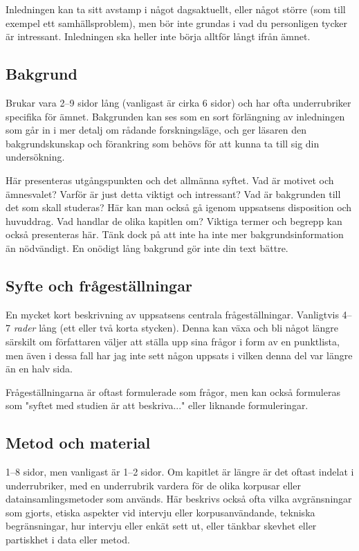 Inledningen kan ta sitt avstamp i något dagsaktuellt, eller något större (som
till exempel ett samhällsproblem), men bör inte grundas i vad du personligen
tycker är intressant. Inledningen ska heller inte börja alltför långt ifrån
ämnet.


\subsection{Bakgrund}
\label{rubrik.bakgrund}

Brukar vara 2--9 sidor lång (vanligast är cirka 6 sidor) och har ofta
underrubriker specifika för ämnet. Bakgrunden kan ses som en sort förlängning
av inledningen som går in i mer detalj om rådande forskningsläge, och ger
läsaren den bakgrundskunskap och förankring som behövs för att kunna ta till
sig din undersökning.

Här presenteras utgångspunkten och det allmänna syftet. Vad är motivet och
ämnesvalet? Varför är just detta viktigt och intressant? Vad är bakgrunden till
det som skall studeras? Här kan man också gå igenom uppsatsens disposition och
huvuddrag. Vad handlar de olika kapitlen om? Viktiga termer och begrepp kan
också presenteras här. Tänk dock på att inte ha inte mer bakgrundsinformation
än nödvändigt. En onödigt lång bakgrund gör inte din text bättre.


\subsection{Syfte och frågeställningar}
\label{rubrik.syfte}

En mycket kort beskrivning av uppsatsens centrala frågeställningar. Vanligtvis
4–7 \emph{rader} lång (ett eller två korta stycken). Denna kan växa och bli
något längre särskilt om författaren väljer att ställa upp sina frågor i form
av en punktlista, men även i dessa fall har jag inte sett någon uppsats i
vilken denna del var längre än en halv sida.

Frågeställningarna är oftast formulerade som frågor, men kan också formuleras
som "syftet med studien är att beskriva..." eller liknande formuleringar.


\subsection{Metod och material}
\label{rubrik.metod}

1--8 sidor, men vanligast är 1--2 sidor. Om kapitlet är längre är det oftast
indelat i underrubriker, med en underrubrik vardera för de olika korpusar eller
datainsamlingsmetoder som används. Här beskrivs också ofta vilka avgränsningar
som gjorts, etiska aspekter vid intervju eller korpusanvändande, tekniska
begränsningar, hur intervju eller enkät sett ut, eller tänkbar skevhet eller
partiskhet i data eller metod.


